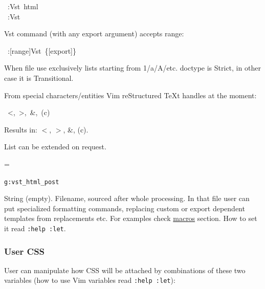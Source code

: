 \documentclass[12pt]{article}
\newenvironment{deflist}[1]{%
\begin{list}{}
{\renewcommand{\makelabel}[1]{\textbf{##1}\hfill}
\settowidth{\labelwidth}{\textbf{#1}}
\leftmargin=\labelwidth
\advance \leftmargin\labelsep}}
{\end{list}}
\begin{document}
\begin{ttfamily}\begin{flushleft}
\mbox{~:Vst~html}\\
\mbox{~:Vst}\\
\end{flushleft}\end{ttfamily}

Vst command (with any export argument) accepts range:

\begin{ttfamily}\begin{flushleft}
\mbox{~:[range]Vst~\{[export]\}}\\
\end{flushleft}\end{ttfamily}

When file use exclusively lists starting from 1/a/A/etc. doctype is Strict, in
other case it is Transitional.

From special characters/entities Vim reStructured \TeX{}t handles at the moment:

\begin{ttfamily}\begin{flushleft}
\mbox{~<,~>,~\&,~(c)}\\
\end{flushleft}\end{ttfamily}

Results in: $<$, $>$, \&, (c).

List can be extended on request.

\hypertarget{lvhp}{}

\begin{deflist}{iii}

\item[\texttt{g:vst\_html\_post}]

String (empty). Filename, sourced after whole processing. In that file
user can put specialized formatting commands, replacing custom or export
dependent templates from replacements etc. For examples check \href{\#lmacros}{macros}
section. How to set it read \texttt{:help :let}.
\end{deflist}
\hypertarget{luser-css}{}
\subsubsection{User CSS}

User can manipulate how CSS will be attached by combinations of these two
variables (how to use Vim variables read \texttt{:help :let}):
\end{document}
